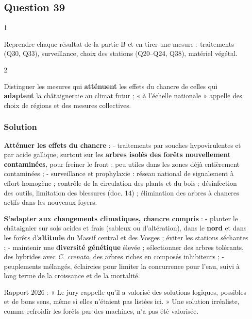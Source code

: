 \documentclass[11pt,a4paper]{article}
\begin{document}
\hypertarget{question-39}{%
\subsection{Question 39}\label{question-39}}

\begin{indication}{1}

Reprendre chaque résultat de la partie B et en tirer une mesure : traitements (Q30, Q33), surveillance, choix des stations (Q20--Q24, Q38), matériel végétal.

\end{indication}

\begin{indication}{2}

Distinguer les mesures qui \textbf{atténuent} les effets du chancre de celles qui \textbf{adaptent} la châtaigneraie au climat futur ; « à l'échelle nationale » appelle des choix de régions et des mesures collectives.

\end{indication}

\hypertarget{solution-39}{%
\subsubsection{Solution}\label{solution-39}}

\textbf{Atténuer les effets du chancre} :
- traitements par souches hypovirulentes et par acide gallique, surtout sur les \textbf{arbres isolés des forêts nouvellement contaminées}, pour freiner le front ; peu utiles dans les zones déjà entièrement contaminées ;
- surveillance et prophylaxie : réseau national de signalement à effort homogène ; contrôle de la circulation des plants et du bois ; désinfection des outils, limitation des blessures (doc. 14) ; élimination des arbres à chancres actifs dans les nouveaux foyers.

\textbf{S'adapter aux changements climatiques, chancre compris} :
- planter le châtaignier sur sols acides et frais (sableux ou d'altération), dans le \textbf{nord} et dans les forêts d'\textbf{altitude} du Massif central et des Vosges ; éviter les stations séchantes ;
- maintenir une \textbf{diversité génétique} élevée ; sélectionner des arbres tolérants, des hybrides avec \emph{C. crenata}, des arbres riches en composés inhibiteurs ;
- peuplements mélangés, éclaircies pour limiter la concurrence pour l'eau, suivi à long terme de la croissance et de la mortalité.

\begin{jury}

Rapport 2026 : « Le jury rappelle qu'il a valorisé des solutions logiques, possibles et de bons sens, même si elles n'étaient pas listées ici. » Une solution irréaliste, comme refroidir les forêts par des machines, n'a pas été valorisée.

\end{jury}
\end{document}
